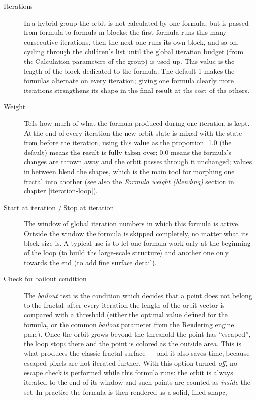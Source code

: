 \begin{description}
	\item[Iterations] In a hybrid group the orbit is not calculated by one formula, but is passed
	from formula to formula in blocks: the first formula runs this many consecutive iterations,
	then the next one runs its own block, and so on, cycling through the children's list until
	the global iteration budget (from the Calculation parameters of the group) is used up. This
	value is the length of the block dedicated to the formula. The default 1 makes the formulas
	alternate on every iteration; giving one formula clearly more iterations strengthens its
	shape in the final result at the cost of the others.
	\item[Weight] Tells how much of what the formula produced during one iteration is kept. At
	the end of every iteration the new orbit state is mixed with the state from before the
	iteration, using this value as the proportion. 1.0 (the default) means the result is fully
	taken over; 0.0 means the formula's changes are thrown away and the orbit passes through it
	unchanged; values in between blend the shapes, which is the main tool for morphing one
	fractal into another (see also the \emph{Formula weight (blending)} section in chapter
	\ref{iteration-loop}).
	\item[Start at iteration / Stop at iteration] The window of global iteration numbers in which
	this formula is active. Outside the window the formula is skipped completely, no matter what
	its block size is. A typical use is to let one formula work only at the beginning of the
	loop (to build the large-scale structure) and another one only towards the end (to add fine
	surface detail).
	\item[Check for bailout condition] The \emph{bailout} test is the condition which decides
	that a point does not belong to the fractal: after every iteration the length of the orbit
	vector is compared with a threshold (either the optimal value defined for the formula, or
	the common \emph{bailout} parameter from the Rendering engine pane). Once the orbit grows
	beyond the threshold the point has ``escaped'', the loop stops there and the point is
	colored as the outside area. This is what produces the classic fractal surface --- and it
	also saves time, because escaped pixels are not iterated further.
	With this option turned \emph{off}, no escape check is performed while this formula runs:
	the orbit is always iterated to the end of its window and such points are counted as
	\emph{inside} the set. In practice the formula is then rendered as a solid, filled shape,

\end{description}
